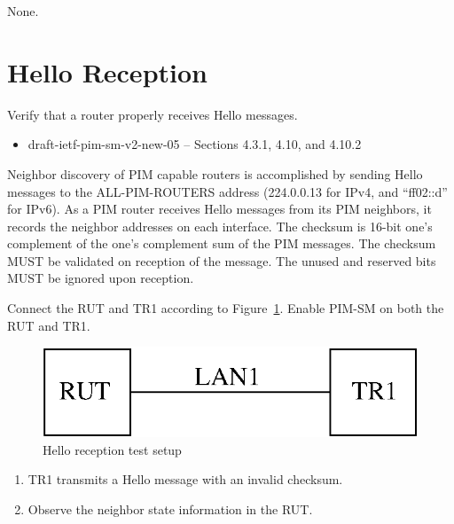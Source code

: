 \documentclass[11pt]{report}
\begin{document}
None.

\newpage
\section{Hello Reception}

Verify that a router properly receives Hello messages.

\begin{itemize}
  \item draft-ietf-pim-sm-v2-new-05 -- Sections 4.3.1, 4.10, and 4.10.2
\end{itemize}

Neighbor discovery of PIM capable routers is accomplished by sending Hello
messages to the ALL-PIM-ROUTERS address (224.0.0.13 for IPv4,
and ``ff02::d'' for IPv6). As a PIM router receives Hello messages from its
PIM neighbors, it records the neighbor addresses on each interface.
The checksum is 16-bit one's complement of the one's complement sum of the PIM
messages. The checksum MUST be validated on reception of the message.
The unused and reserved bits MUST be ignored upon reception.

Connect the RUT and TR1 according to Figure~\ref{fig:hello_reception}.
Enable PIM-SM on both the RUT and TR1.

\begin{figure}[htbp]
  \begin{center}
    \includegraphics[scale=0.8]{figs/pim_test_2_3_hello_reception}
    \caption{Hello reception test setup}
    \label{fig:hello_reception}
  \end{center}
\end{figure}



\begin{enumerate}

  \item TR1 transmits a Hello message with an invalid checksum.

  \item Observe the neighbor state information in the RUT.

\end{enumerate}
\end{document}
